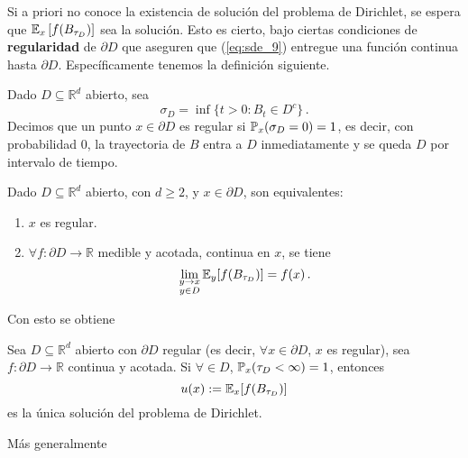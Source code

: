 \newp Si a priori no conoce la existencia de solución del problema de Dirichlet, se espera que $\E_{x} \left[ f(B_{\tau_D}) \right]$ sea la solución. Esto es cierto, bajo ciertas condiciones de \textbf{regularidad} de $\partial D$ que aseguren que (\ref{eq:sde_9}) entregue una función continua hasta $\partial D$. Específicamente tenemos la definición siguiente.
\begin{definition}
Dado $D \subseteq \mathbb{R}^{d}$ abierto, sea 
\begin{equation*}
    \sigma_D = \inf \{ t> 0: B_t \in D^{c}\} \,.
\end{equation*}
Decimos que un punto $x \in \partial D$ es regular si $\P_x (\sigma_D = 0) =1$, es decir, con probabilidad $0$, la trayectoria de $B$ entra a $D$ inmediatamente y se queda $D$ por intervalo de tiempo.
\end{definition}

\begin{theorem}
Dado $D \subseteq \mathbb{R}^{d}$ abierto, con $d \ge  2$, y $x \in \partial D$, son equivalentes: 
\begin{enumerate}
    \item $x$ es regular.
    \item $\forall  f : \partial D \to \mathbb{R}$  medible y acotada, continua en $x$, se tiene 
        \begin{equation*}
            \lim_{\substack{y \to  x \\ y \in D}} \E_{y} [f(B_{\tau_D})] = f(x) \,.
        \end{equation*}
\end{enumerate}
\end{theorem}

Con esto se obtiene 
\begin{theorem}
    Sea $D \subseteq \mathbb{R}^{d}$ abierto con $\partial D$ regular (es decir, $\forall x \in \partial D$, $x$ es regular), sea $f : \partial D \to  \mathbb{R}$ continua y acotada. Si $\forall  \in D$, $\P_{x} (\tau_D < \infty ) = 1$, entonces 
    \begin{equation*}
        u(x) := \E_{x} [f(B_{\tau_D})]
    \end{equation*}
    es la única solución del problema de Dirichlet. %
\end{theorem}

Más generalmente 

